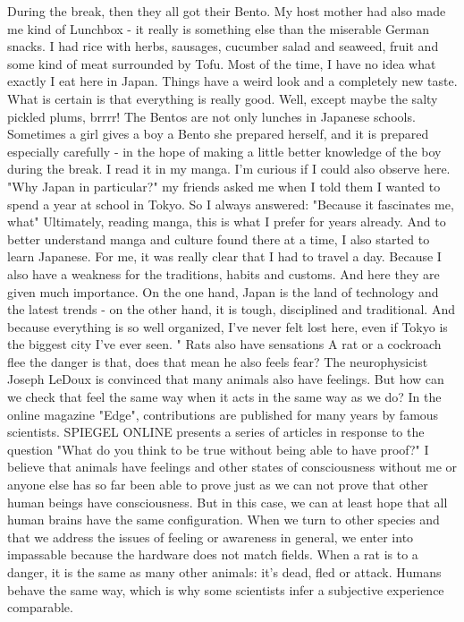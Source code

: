 During the break, then they all got their Bento.
My host mother had also made me kind of Lunchbox - it really is something else than the miserable German snacks.
I had rice with herbs, sausages, cucumber salad and seaweed, fruit and some kind of meat surrounded by Tofu.
Most of the time, I have no idea what exactly I eat here in Japan.
Things have a weird look and a completely new taste.
What is certain is that everything is really good.
Well, except maybe the salty pickled plums, brrrr!
The Bentos are not only lunches in Japanese schools.
Sometimes a girl gives a boy a Bento she prepared herself, and it is prepared especially carefully - in the hope of making a little better knowledge of the boy during the break.
I read it in my manga.
I'm curious if I could also observe here.
"Why Japan in particular?" my friends asked me when I told them I wanted to spend a year at school in Tokyo.
So I always answered:
"Because it fascinates me, what"
Ultimately, reading manga, this is what I prefer for years already.
And to better understand manga and culture found there at a time, I also started to learn Japanese.
For me, it was really clear that I had to travel a day.
Because I also have a weakness for the traditions, habits and customs.
And here they are given much importance.
On the one hand, Japan is the land of technology and the latest trends - on the other hand, it is tough, disciplined and traditional.
And because everything is so well organized, I've never felt lost here, even if Tokyo is the biggest city I've ever seen. "
Rats also have sensations
A rat or a cockroach flee the danger is that, does that mean he also feels fear?
The neurophysicist Joseph LeDoux is convinced that many animals also have feelings.
But how can we check that feel the same way when it acts in the same way as we do?
In the online magazine "Edge", contributions are published for many years by famous scientists.
SPIEGEL ONLINE presents a series of articles in response to the question "What do you think to be true without being able to have proof?"
I believe that animals have feelings and other states of consciousness without me or anyone else has so far been able to prove just as we can not prove that other human beings have consciousness.
But in this case, we can at least hope that all human brains have the same configuration.
When we turn to other species and that we address the issues of feeling or awareness in general, we enter into impassable because the hardware does not match fields.
When a rat is to a danger, it is the same as many other animals: it's dead, fled or attack.
Humans behave the same way, which is why some scientists infer a subjective experience comparable.
